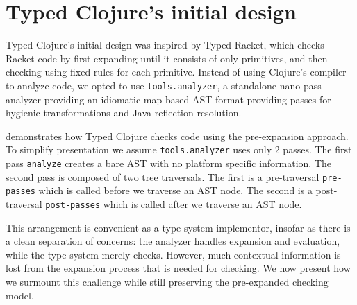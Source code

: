\chapter{Typed Clojure's initial design}

Typed Clojure's initial design was inspired by Typed Racket,
which checks Racket code by first expanding until it consists
of only primitives, and then checking using fixed rules for each
primitive.
Instead of using Clojure's compiler to analyze code,
we opted to use \texttt{tools.analyzer}, a standalone nano-pass
analyzer providing an idiomatic map-based AST format providing
passes for hygienic transformations and Java reflection resolution.


 demonstrates 
how Typed Clojure checks code using the pre-expansion approach.
To simplify presentation we assume \texttt{tools.analyzer}
uses only 2 passes. The first pass \texttt{analyze} creates
a bare AST with no platform specific information.
The second pass is composed of two tree traversals.
The first is a pre-traversal \texttt{pre-passes} which
is called before we traverse an AST node.
The second is a post-traversal \texttt{post-passes} which
is called after we traverse an AST node.

This arrangement is convenient as a type system implementor,
insofar as there is a clean separation of concerns: the analyzer
handles expansion and evaluation, while the type system
merely checks.
However, much contextual information is lost from the expansion
process that is needed for checking.
We now present how we surmount this challenge while still
preserving the pre-expanded checking model.

